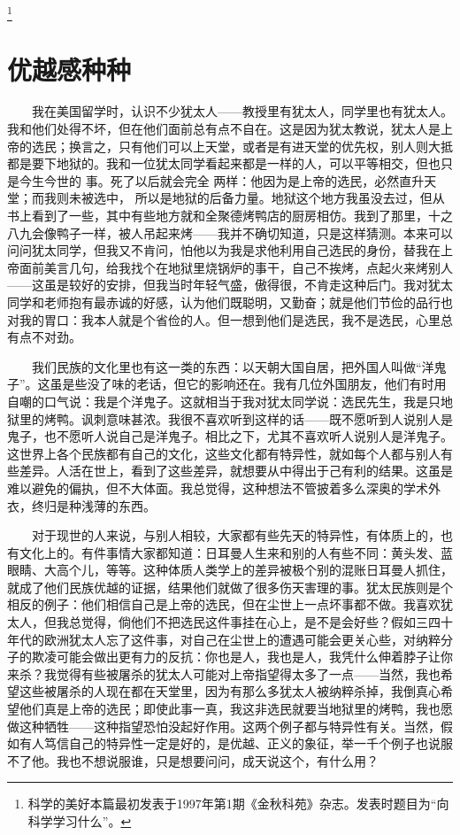 \footnote{科学的美好本篇最初发表于1997年第1期《金秋科苑》杂志。发表时题目为“向科学学习什么”。}

\chapter{优越感种种}

　　我在美国留学时，认识不少犹太人——教授里有犹太人，同学里也有犹太人。我和他们处得不坏，但在他们面前总有点不自在。这是因为犹太教说，犹太人是上帝的选民；换言之，只有他们可以上天堂，或者是有进天堂的优先权，别人则大抵都是要下地狱的。我和一位犹太同学看起来都是一样的人，可以平等相交，但也只是今生今世的 事。死了以后就会完全 两样：他因为是上帝的选民，必然直升天堂；而我则未被选中， 所以是地狱的后备力量。地狱这个地方我虽没去过，但从书上看到了一些，其中有些地方就和全聚德烤鸭店的厨房相仿。我到了那里，十之八九会像鸭子一样，被人吊起来烤——我并不确切知道，只是这样猜测。本来可以问问犹太同学，但我又不肯问，怕他以为我是求他利用自己选民的身份，替我在上帝面前美言几句，给我找个在地狱里烧锅炉的事干，自己不挨烤，点起火来烤别人——这虽是较好的安排，但我当时年轻气盛，傲得很，不肯走这种后门。我对犹太同学和老师抱有最赤诚的好感，认为他们既聪明，又勤奋；就是他们节俭的品行也对我的胃口：我本人就是个省俭的人。但一想到他们是选民，我不是选民，心里总有点不对劲。

　　我们民族的文化里也有这一类的东西：以天朝大国自居，把外国人叫做“洋鬼子”。这虽是些没了味的老话，但它的影响还在。我有几位外国朋友，他们有时用自嘲的口气说：我是个洋鬼子。这就相当于我对犹太同学说：选民先生，我是只地狱里的烤鸭。讽刺意味甚浓。我很不喜欢听到这样的话——既不愿听到人说别人是鬼子，也不愿听人说自己是洋鬼子。相比之下，尤其不喜欢听人说别人是洋鬼子。这世界上各个民族都有自己的文化，这些文化都有特异性，就如每个人都与别人有些差异。人活在世上，看到了这些差异，就想要从中得出于己有利的结果。这虽是难以避免的偏执，但不大体面。我总觉得，这种想法不管披着多么深奥的学术外衣，终归是种浅薄的东西。

　　对于现世的人来说，与别人相较，大家都有些先天的特异性，有体质上的，也有文化上的。有件事情大家都知道：日耳曼人生来和别的人有些不同：黄头发、蓝眼睛、大高个儿，等等。这种体质人类学上的差异被极个别的混账日耳曼人抓住，就成了他们民族优越的证据，结果他们就做了很多伤天害理的事。犹太民族则是个相反的例子：他们相信自己是上帝的选民，但在尘世上一点坏事都不做。我喜欢犹太人，但我总觉得，倘他们不把选民这件事挂在心上，是不是会好些？假如三四十年代的欧洲犹太人忘了这件事，对自己在尘世上的遭遇可能会更关心些，对纳粹分子的欺凌可能会做出更有力的反抗：你也是人，我也是人，我凭什么伸着脖子让你来杀？我觉得有些被屠杀的犹太人可能对上帝指望得太多了一点——当然，我也希望这些被屠杀的人现在都在天堂里，因为有那么多犹太人被纳粹杀掉，我倒真心希望他们真是上帝的选民；即使此事一真，我这非选民就要当地狱里的烤鸭，我也愿做这种牺牲——这种指望恐怕没起好作用。这两个例子都与特异性有关。当然，假如有人笃信自己的特异性一定是好的，是优越、正义的象征，举一千个例子也说服不了他。我也不想说服谁，只是想要问问，成天说这个，有什么用？

